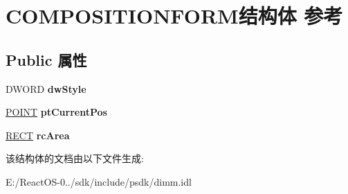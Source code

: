 \hypertarget{struct_c_o_m_p_o_s_i_t_i_o_n_f_o_r_m}{}\section{C\+O\+M\+P\+O\+S\+I\+T\+I\+O\+N\+F\+O\+R\+M结构体 参考}
\label{struct_c_o_m_p_o_s_i_t_i_o_n_f_o_r_m}
\subsection*{Public 属性}
\begin{DoxyCompactItemize}
\item 
\mbox{\label{struct_c_o_m_p_o_s_i_t_i_o_n_f_o_r_m_a78a206b69bc91d8a2d6ec444616f7e04}} 
D\+W\+O\+RD {\bfseries dw\+Style}
\item 
\mbox{\label{struct_c_o_m_p_o_s_i_t_i_o_n_f_o_r_m_ae9bafa391a91b98cdca78f667c1b852b}} 
\hyperlink{structtag_p_o_i_n_t}{P\+O\+I\+NT} {\bfseries pt\+Current\+Pos}
\item 
\mbox{\label{struct_c_o_m_p_o_s_i_t_i_o_n_f_o_r_m_a4bf4f0d2e5840c943632e4987a5ba5b6}} 
\hyperlink{structtag_r_e_c_t}{R\+E\+CT} {\bfseries rc\+Area}
\end{DoxyCompactItemize}


该结构体的文档由以下文件生成\+:\begin{DoxyCompactItemize}
\item 
E\+:/\+React\+O\+S-\/0../sdk/include/psdk/dimm.\+idl\end{DoxyCompactItemize}
